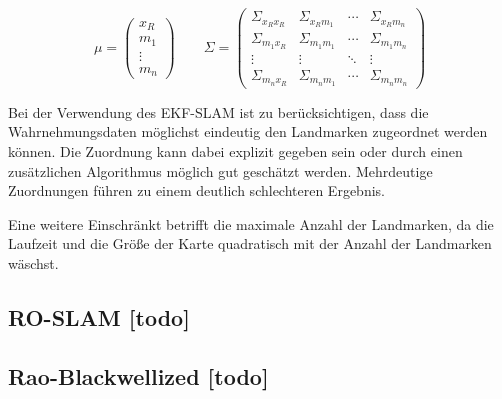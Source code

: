 \begin{equation}
\mu = \begin{pmatrix} x_R \\ m_1 \\ \vdots \\ m_n \end{pmatrix}
\qquad
\Sigma = \begin{pmatrix}
	\Sigma_{x_R x_R} & \Sigma_{x_R m_1} & \cdots & \Sigma_{x_R m_n} \\
	\Sigma_{m_1 x_R} & \Sigma_{m_1 m_1} & \cdots & \Sigma_{m_1 m_n} \\
	\vdots & \vdots & \ddots & \vdots \\
	\Sigma_{m_n x_R} & \Sigma_{m_n m_1} & \cdots & \Sigma_{m_n m_n}
\end{pmatrix}
\label{eq:ekf_slam_mu_sigma}
\end{equation}

Bei der Verwendung des EKF-SLAM ist zu berücksichtigen, dass die Wahrnehmungsdaten möglichst eindeutig den Landmarken zugeordnet werden können. Die Zuordnung kann dabei explizit gegeben sein oder durch einen zusätzlichen Algorithmus möglich gut geschätzt werden. Mehrdeutige Zuordnungen führen zu einem deutlich schlechteren Ergebnis.

Eine weitere Einschränkt betrifft die maximale Anzahl der Landmarken, da die Laufzeit und die Größe der Karte quadratisch mit der Anzahl der Landmarken wäschst.


%
%
\subsection{RO-SLAM [todo]}


%
%
\subsection{Rao-Blackwellized [todo]}


